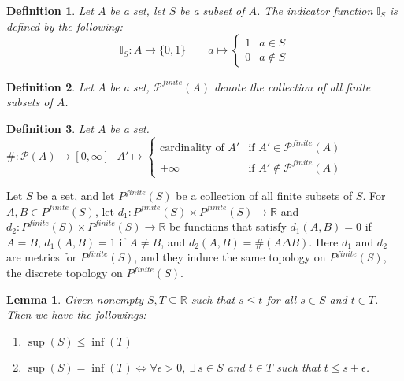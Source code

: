 \documentclass[11pt,oneside]{book}
\theoremstyle{break}
\theoremstyle{break}
\newtheorem{lem}{Lemma}[thm]
\newtheorem{defn}{Definition}[corL]
\newcommand{\R}{\mathbb{R}}
\newcommand{\Power}{\mathcal{P}}
\begin{document}
\begin{defn}
Let $A$ be a set, let $S$ be a subset of $A$. The indicator function $\mathbb{I}_S$ is defined by the following:
$$\mathbb{I}_S: A \to \{0,1\} \qquad a\mapsto \begin{cases} 1 & a \in S \\ 0 & a \notin S\end{cases}$$
\end{defn}

\begin{defn}
Let $A$ be a set, $\Power^{finite}(A)$ denote the collection of all finite subsets of $A$.
\end{defn}

\begin{defn}
Let $A$ be a set. $\# : \Power(A) \to [0,\infty] \ \ \ A' \mapsto \begin{cases}
\text{cardinality of }A' & \text{if }A'  \in \Power^{finite}(A)\\
+ \infty & \text{if }A'  \notin \Power^{finite}(A)
\end{cases}$
\end{defn}

Let $S$ be a set, and let $P^{finite}(S)$ be a collection of all finite subsets of $S$. For $A, B \in P^{finite}(S)$, let $d_1:P^{finite}(S)\times P^{finite}(S) \to \R$ and $d_2:P^{finite}(S)\times P^{finite}(S) \to \R$ be functions that satisfy $d_1(A,B) = 0$ if $A=B$, $d_1(A,B) = 1$ if $A\neq B$, and $d_2(A,B) = \#(A\Delta B)$. Here $d_1$ and $d_2$ are metrics for $P^{finite}(S)$, and they induce the same topology on $P^{finite}(S)$, the discrete topology on $P^{finite}(S)$. 


\begin{lem}
Given nonempty $S,T \subseteq \R$ such that $s\leq t$ for all $s \in S$ and $t \in T$. Then we have the followings:
\begin{enumerate}[topsep=3pt,itemsep=-1ex,partopsep=1ex,parsep=1ex]
\item $\sup(S) \leq \inf(T)$
\item $\sup(S) = \inf(T) \iff \forall \epsilon>0,\ \exists\ s \in S$ and $t \in T$ such that $t \leq s+\epsilon$.
\end{enumerate}
\end{lem}
\end{document}

